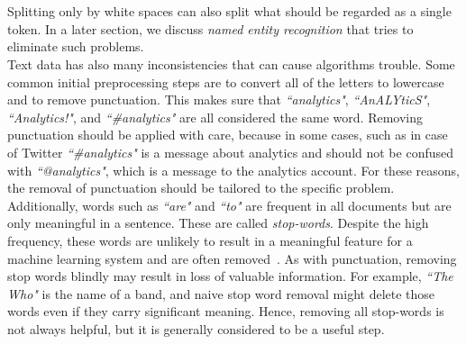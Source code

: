      \\
\\
Splitting only by white spaces can also split what should be regarded as a single token. In a later section, we discuss \emph{named entity recognition} that tries to eliminate such problems. \\
\noindent
Text data has also many inconsistencies that can cause algorithms trouble. Some common initial preprocessing steps are to convert all of the letters to lowercase and to remove punctuation.
This makes sure that \emph{``analytics"}, \emph{``AnALYticS"}, \emph{``Analytics!"}, and \emph{``\#analytics"} are all considered the same word. Removing punctuation should be applied with care, because in some cases, such as in case of Twitter \emph{``\#analytics"} is a message about analytics and should not be confused with \emph{``@analytics"}, which is a message to the analytics account. For these reasons, the removal of punctuation should be tailored to the specific problem.\\
Additionally, words such as \emph{``are"} and \emph{``to"} are frequent in all documents but are only meaningful in a sentence. These are called \emph{stop-words}. Despite the high frequency, these words are unlikely to result in a meaningful feature for a machine learning system and are often removed~. As with punctuation, removing stop words blindly may result in loss of valuable information. For example, \emph{``The Who"} is the name of a band, and naive stop word removal might delete those words even if they carry significant meaning. Hence, removing all stop-words is not always helpful, but it is generally considered to be a useful step. 

